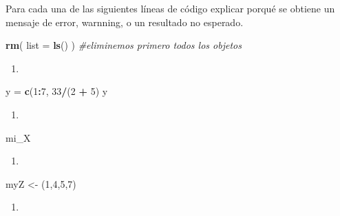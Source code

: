 \documentclass[]{book}
\newenvironment{Shaded}{\begin{snugshade}}{\end{snugshade}}
\newcommand{\CommentTok}[1]{\textcolor[rgb]{0.56,0.35,0.01}{\textit{#1}}}
\newcommand{\DataTypeTok}[1]{\textcolor[rgb]{0.13,0.29,0.53}{#1}}
\newcommand{\DecValTok}[1]{\textcolor[rgb]{0.00,0.00,0.81}{#1}}
\newcommand{\KeywordTok}[1]{\textcolor[rgb]{0.13,0.29,0.53}{\textbf{#1}}}
\newcommand{\NormalTok}[1]{#1}
\newcommand{\OperatorTok}[1]{\textcolor[rgb]{0.81,0.36,0.00}{\textbf{#1}}}
\newcommand{\StringTok}[1]{\textcolor[rgb]{0.31,0.60,0.02}{#1}}
\begin{document}
Para cada una de las siguientes líneas de código explicar porqué se obtiene un mensaje de error, warnning, o un resultado no esperado.

\begin{Shaded}
\begin{Highlighting}[]
\KeywordTok{rm}\NormalTok{( }\DataTypeTok{list =} \KeywordTok{ls}\NormalTok{() ) }\CommentTok{#eliminemos primero todos los objetos}
\end{Highlighting}
\end{Shaded}

\begin{enumerate}
\def\labelenumi{\arabic{enumi}.}
\item
\end{enumerate}

\begin{Shaded}
\begin{Highlighting}[]
\NormalTok{  y =}\StringTok{ }\KeywordTok{c}\NormalTok{(}\DecValTok{1}\OperatorTok{:}\DecValTok{7}\NormalTok{, }\DecValTok{33}\OperatorTok{/}\NormalTok{(}\DecValTok{2} \OperatorTok{+}\StringTok{ }\DecValTok{5}\NormalTok{)}
\NormalTok{  y}
\end{Highlighting}
\end{Shaded}

\begin{enumerate}
\def\labelenumi{\arabic{enumi}.}
\setcounter{enumi}{1}
\item
\end{enumerate}

\begin{Shaded}
\begin{Highlighting}[]
\NormalTok{  mi_X}
\end{Highlighting}
\end{Shaded}

\begin{enumerate}
\def\labelenumi{\arabic{enumi}.}
\setcounter{enumi}{2}
\item
\end{enumerate}

\begin{Shaded}
\begin{Highlighting}[]
\NormalTok{  myZ <-}\StringTok{ }\NormalTok{(}\DecValTok{1}\NormalTok{,}\DecValTok{4}\NormalTok{,}\DecValTok{5}\NormalTok{,}\DecValTok{7}\NormalTok{)}
\end{Highlighting}
\end{Shaded}

\begin{enumerate}
\def\labelenumi{\arabic{enumi}.}
\setcounter{enumi}{3}
\item
\end{enumerate}
\end{document}
